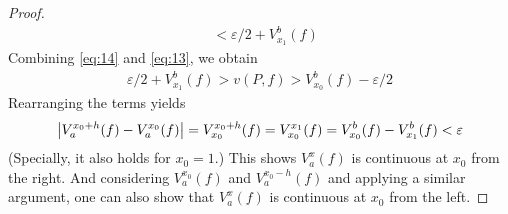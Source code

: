\documentclass[thmcnt=section, color=blue, 12pt]{my-elegantbook}
\begin{document}
\begin{proof}
\begin{align}
		 & < \varepsilon/2 + V_{x_1}^b(f)
		\label{eq:13}
	\end{align}
	Combining \eqref{eq:14} and \eqref{eq:13}, we obtain
	\begin{align*}
		\varepsilon/2 + V_{x_1}^b(f) > v(P, f) > V_{x_0}^b(f) - \varepsilon/2
	\end{align*}
	Rearranging the terms yields
	\begin{align*}
		\left\lvert V_a^{x_0+h}(f) - V_a^{x_0}(f) \right\rvert
		= V_{x_0}^{x_0 + h}(f)
		= V_{x_0}^{x_1}(f)
		= V_{x_0}^b(f) - V_{x_1}^b(f)
		< \varepsilon
	\end{align*}
	(Specially, it also holds for $x_0 = 1$.)
	This shows $V_a^x(f)$ is continuous at $x_0$ from the right.
	And considering $V_a^{x_0}(f)$ and $V_a^{x_0-h}(f)$ and applying a similar argument,
	one can also show that $V_a^{x}(f)$ is continuous at $x_0$ from the left.
\end{proof}


\printbibliography[heading=bibintoc, title=References]


\printindex
\end{document}
